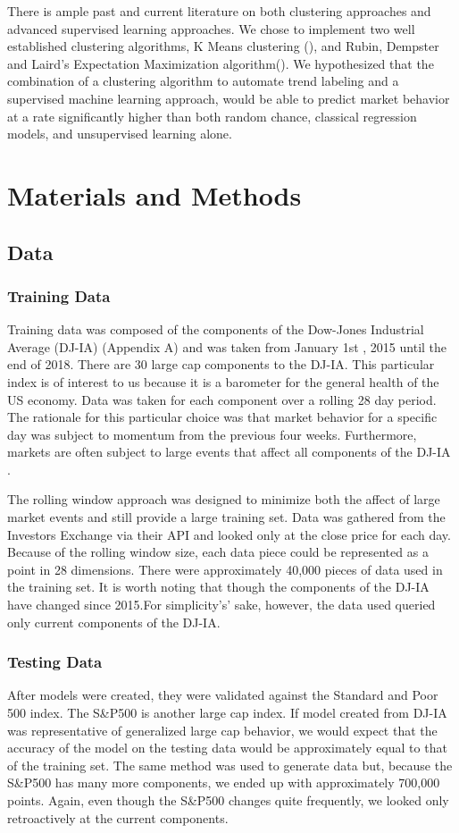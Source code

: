 \documentclass{article}
\begin{document}
There is ample past and current literature on both clustering approaches and advanced supervised learning approaches. We chose to implement two well established clustering algorithms, K Means clustering (\cite{murphy}), and Rubin, Dempster and Laird’s Expectation Maximization algorithm(\cite{dempster}). We hypothesized that the combination of a clustering algorithm to automate trend labeling and a supervised machine learning approach, would be able to predict market behavior at a rate significantly higher than both random chance, classical regression models, and unsupervised learning alone.   


\section{Materials and Methods}
\subsection{Data}
\subsubsection{Training Data}
Training data was composed of the components of the Dow-Jones Industrial Average (DJ-IA) (Appendix A) and was taken from January 1st , 2015  until the end of 2018. There are 30 large cap components to the DJ-IA. This particular index is of interest to us because it is a barometer for the general health of the US economy. Data was taken for each component over a rolling 28 day period. The rationale for this particular choice was that market behavior for a specific day was subject to momentum from the previous four weeks. Furthermore, markets are often subject to large events that affect all components of the DJ-IA . 

The rolling window approach was designed to minimize both the affect of large market events and still provide a large training set. Data was gathered from the Investors Exchange via their API and looked only at the close price for each day. Because of the rolling window size, each data piece could be represented as a point in 28 dimensions. There were approximately 40,000 pieces of data used in the training set. It is worth noting that though the components of the DJ-IA have changed since 2015.For simplicity's' sake, however, the data used queried only current components of the DJ-IA.
\subsubsection{Testing Data}
After models were created, they were validated against the  Standard and Poor 500 index. The S\&P500 is another large cap index. If model created from DJ-IA was representative of generalized large cap behavior, we would expect that the accuracy of the model on the testing data would be approximately equal to that of the training set. The same method was used to generate data but, because the S\&P500 has many more components, we  ended up with approximately 700,000 points. Again, even though the S\&P500 changes quite frequently, we looked only retroactively at the current components. 
\end{document}
